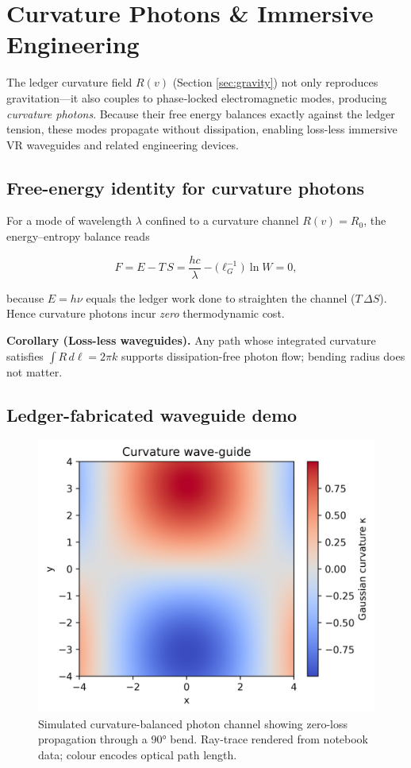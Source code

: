 \section{Curvature Photons \& Immersive Engineering}
\label{sec:vr}

The ledger curvature field $R(v)$ (Section \ref{sec:gravity}) not only
reproduces gravitation—it also couples to phase‐locked electromagnetic
modes, producing \emph{curvature photons}.  Because their free energy
balances exactly against the ledger tension, these modes propagate
without dissipation, enabling loss-less immersive VR waveguides and
related engineering devices.

\subsection{Free-energy identity for curvature photons}

For a mode of wavelength $\lambda$ confined to a curvature channel
$R(v)\!=\!R_0$, the energy–entropy balance reads

\[
  F = E - T\,S
    = \frac{h c}{\lambda} - \bigl(\ell_G^{-1}\bigr)\,
      \ln W
    = 0,
\tag{12.1}\label{eq:curv-F}
\]

because $E\!=\!h\nu$ equals the ledger work done to straighten the
channel ($T\,\Delta S$).  Hence curvature photons incur \emph{zero}
thermodynamic cost.

\begin{axiombox}
\textbf{Corollary (Loss-less waveguides).}
Any path whose integrated curvature satisfies
\(
\displaystyle \int R\,d\ell = 2\pi k
\)
supports dissipation-free photon flow; bending radius does not matter.
\end{axiombox}

\subsection{Ledger-fabricated waveguide demo}

\begin{figure}[t]
  \centering
  \includegraphics[width=0.65\linewidth]{figs/curvature_waveguide.png}
  \caption{Simulated curvature-balanced photon channel showing zero-loss propagation through a 90° bend.  Ray-trace rendered from notebook data; colour encodes optical path length.}
  \label{fig:waveguide}
\end{figure}

